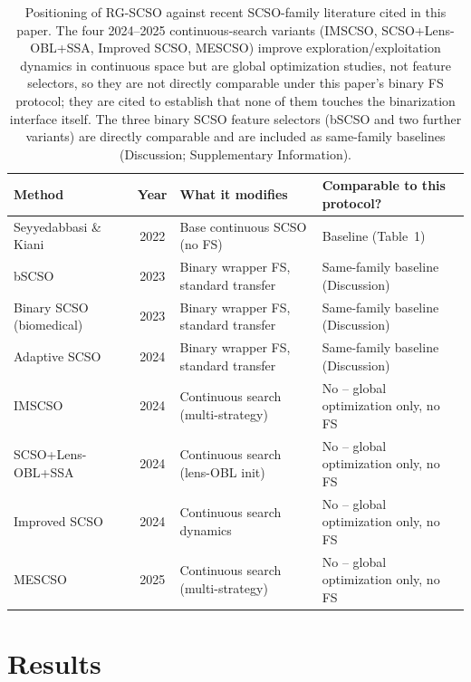 \documentclass[iicol,sn-basic,pdflatex]{sn-jnl}
\begin{document}
\begin{table}[t]
\centering
\caption{Positioning of RG-SCSO against recent SCSO-family literature cited in this paper. The four 2024--2025 continuous-search variants (IMSCSO, SCSO+Lens-OBL+SSA, Improved SCSO, MESCSO) improve exploration/exploitation dynamics in continuous space but are global optimization studies, not feature selectors, so they are not directly comparable under this paper's binary FS protocol; they are cited to establish that none of them touches the binarization interface itself. The three binary SCSO feature selectors (bSCSO and two further variants) are directly comparable and are included as same-family baselines (Discussion; Supplementary Information).}
\label{tab:litpos}
\footnotesize
\begin{tabular}{p{4.2cm}cp{3.6cm}p{3.6cm}}
\toprule
Method & Year & What it modifies & Comparable to this protocol? \\
\midrule
Seyyedabbasi \& Kiani~\cite{scso} & 2022 & Base continuous SCSO (no FS) & Baseline (Table~1) \\
bSCSO~\cite{bscso} & 2023 & Binary wrapper FS, standard transfer & Same-family baseline (Discussion) \\
Binary SCSO (biomedical)~\cite{scsofs2} & 2023 & Binary wrapper FS, standard transfer & Same-family baseline (Discussion) \\
Adaptive SCSO~\cite{scsofs3} & 2024 & Binary wrapper FS, standard transfer & Same-family baseline (Discussion) \\
IMSCSO~\cite{imscso2024} & 2024 & Continuous search (multi-strategy) & No -- global optimization only, no FS \\
SCSO+Lens-OBL+SSA~\cite{scsolensobl2024} & 2024 & Continuous search (lens-OBL init) & No -- global optimization only, no FS \\
Improved SCSO~\cite{improvedscso2024} & 2024 & Continuous search dynamics & No -- global optimization only, no FS \\
MESCSO~\cite{mescso2025} & 2025 & Continuous search (multi-strategy) & No -- global optimization only, no FS \\
\bottomrule
\end{tabular}
\end{table}


\FloatBarrier
\section{Results}
\end{document}
